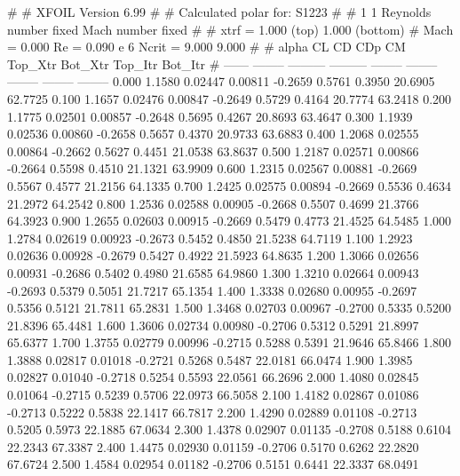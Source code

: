 #  
#       XFOIL         Version 6.99
#  
# Calculated polar for: S1223                                           
#  
# 1 1 Reynolds number fixed          Mach number fixed         
#  
# xtrf =   1.000 (top)        1.000 (bottom)  
# Mach =   0.000     Re =     0.090 e 6     Ncrit =   9.000  9.000
#  
#   alpha    CL        CD       CDp       CM     Top_Xtr  Bot_Xtr  Top_Itr  Bot_Itr
#  ------ -------- --------- --------- -------- -------- -------- -------- --------
   0.000   1.1580   0.02447   0.00811  -0.2659   0.5761   0.3950  20.6905  62.7725
   0.100   1.1657   0.02476   0.00847  -0.2649   0.5729   0.4164  20.7774  63.2418
   0.200   1.1775   0.02501   0.00857  -0.2648   0.5695   0.4267  20.8693  63.4647
   0.300   1.1939   0.02536   0.00860  -0.2658   0.5657   0.4370  20.9733  63.6883
   0.400   1.2068   0.02555   0.00864  -0.2662   0.5627   0.4451  21.0538  63.8637
   0.500   1.2187   0.02571   0.00866  -0.2664   0.5598   0.4510  21.1321  63.9909
   0.600   1.2315   0.02567   0.00881  -0.2669   0.5567   0.4577  21.2156  64.1335
   0.700   1.2425   0.02575   0.00894  -0.2669   0.5536   0.4634  21.2972  64.2542
   0.800   1.2536   0.02588   0.00905  -0.2668   0.5507   0.4699  21.3766  64.3923
   0.900   1.2655   0.02603   0.00915  -0.2669   0.5479   0.4773  21.4525  64.5485
   1.000   1.2784   0.02619   0.00923  -0.2673   0.5452   0.4850  21.5238  64.7119
   1.100   1.2923   0.02636   0.00928  -0.2679   0.5427   0.4922  21.5923  64.8635
   1.200   1.3066   0.02656   0.00931  -0.2686   0.5402   0.4980  21.6585  64.9860
   1.300   1.3210   0.02664   0.00943  -0.2693   0.5379   0.5051  21.7217  65.1354
   1.400   1.3338   0.02680   0.00955  -0.2697   0.5356   0.5121  21.7811  65.2831
   1.500   1.3468   0.02703   0.00967  -0.2700   0.5335   0.5200  21.8396  65.4481
   1.600   1.3606   0.02734   0.00980  -0.2706   0.5312   0.5291  21.8997  65.6377
   1.700   1.3755   0.02779   0.00996  -0.2715   0.5288   0.5391  21.9646  65.8466
   1.800   1.3888   0.02817   0.01018  -0.2721   0.5268   0.5487  22.0181  66.0474
   1.900   1.3985   0.02827   0.01040  -0.2718   0.5254   0.5593  22.0561  66.2696
   2.000   1.4080   0.02845   0.01064  -0.2715   0.5239   0.5706  22.0973  66.5058
   2.100   1.4182   0.02867   0.01086  -0.2713   0.5222   0.5838  22.1417  66.7817
   2.200   1.4290   0.02889   0.01108  -0.2713   0.5205   0.5973  22.1885  67.0634
   2.300   1.4378   0.02907   0.01135  -0.2708   0.5188   0.6104  22.2343  67.3387
   2.400   1.4475   0.02930   0.01159  -0.2706   0.5170   0.6262  22.2820  67.6724
   2.500   1.4584   0.02954   0.01182  -0.2706   0.5151   0.6441  22.3337  68.0491
